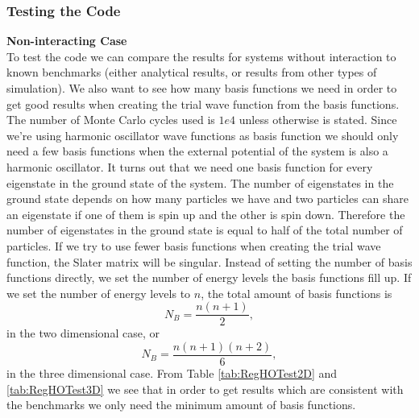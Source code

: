 \documentclass[../main.tex]{subfiles}
\begin{document}
\subsubsection{Testing the Code}

\textbf{Non-interacting Case}
\\To test the code we can compare the results for systems without interaction to known benchmarks (either analytical results, or results from other types of simulation). We also want to see how many basis functions we need in order to get good results when creating the trial wave function from the basis functions. The number of Monte Carlo cycles used is $1e4$ unless otherwise is stated. Since we're using harmonic oscillator wave functions as basis function we should only need a few basis functions when the external potential of the system is also a harmonic oscillator. It turns out that we need one basis function for every eigenstate in the ground state of the system. The number of eigenstates in the ground state depends on how many particles we have and two particles can share an eigenstate if one of them is spin up and the other is spin down. Therefore the number of eigenstates in the ground state is equal to half of the total number of particles. If we try to use fewer basis functions when creating the trial wave function, the Slater matrix will be singular. Instead of setting the number of basis functions directly, we set the number of energy levels the basis functions fill up. If we set the number of energy levels to $n$, the total amount of basis functions is 
\begin{equation}
    N_B = \frac{n(n+1)}{2}, 
\end{equation}
in the two dimensional case, or 
\begin{equation}
    N_B = \frac{n(n+1)(n+2)}{6},
\end{equation}
in the three dimensional case.
From Table \ref{tab:RegHOTest2D} and \ref{tab:RegHOTest3D} we see that in order to get results which are consistent with the benchmarks we only need the minimum amount of basis functions.
\end{document}
